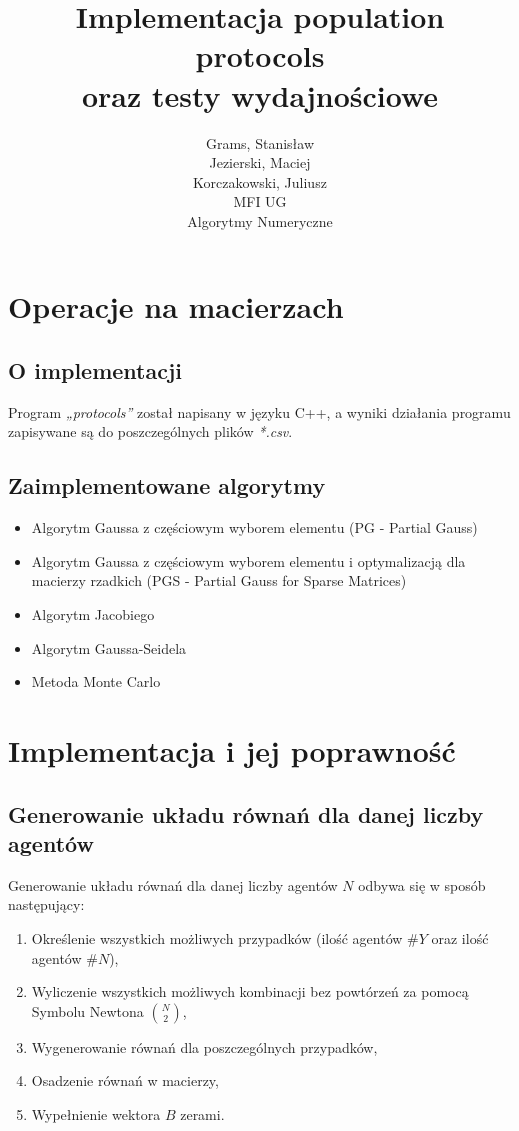 \documentclass[10pt]{article}
\begin{document}
\title{Implementacja population protocols\\oraz testy wydajnościowe}
\author{Grams, Stanisław\\Jezierski, Maciej\\Korczakowski, Juliusz\\ MFI UG\\Algorytmy Numeryczne}

\maketitle
\section {Operacje na macierzach}
\subsection{O implementacji}
Program \textit{„protocols”} został napisany w języku C++, a wyniki działania programu zapisywane są do poszczególnych plików \textit{*.csv}.
\subsection{Zaimplementowane algorytmy}
\begin{itemize}
	\item Algorytm Gaussa z częściowym wyborem elementu (PG - Partial Gauss)
	\item Algorytm Gaussa z częściowym wyborem elementu i optymalizacją dla macierzy rzadkich (PGS - Partial Gauss for Sparse Matrices)
	\item Algorytm Jacobiego
	\item Algorytm Gaussa-Seidela
	\item Metoda Monte Carlo
\end{itemize}

\section{Implementacja i jej poprawność}
\subsection{Generowanie układu równań dla danej liczby agentów}
Generowanie układu równań dla danej liczby agentów $N$ odbywa się w sposób następujący:
\begin{enumerate}
	\item Określenie wszystkich możliwych przypadków (ilość agentów $\#Y$ oraz ilość agentów $\#N$),
	\item Wyliczenie wszystkich możliwych kombinacji bez powtórzeń za pomocą Symbolu Newtona ${{N} \choose {2}}$,
	\item Wygenerowanie równań dla poszczególnych przypadków,
	\item Osadzenie równań w macierzy,
	\item Wypełnienie wektora $B$ zerami.
\end{enumerate}
\end{document}
